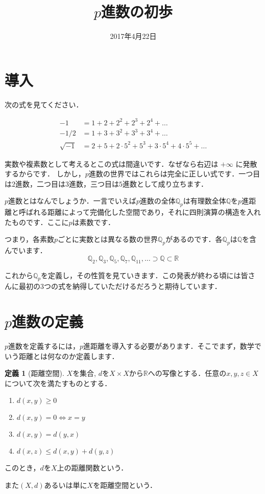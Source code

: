 \documentclass[uplatex]{jsarticle}
\newcommand{\Q}{\mathbb{Q}}
\newcommand{\R}{\mathbb{R}}
\theoremstyle{definition} %
\newtheorem{defi}[thm]{定義}
\begin{document}
\title{$p$進数の初歩}
\date{2017年4月22日}
\maketitle

\section{導入}

次の式を見てください．

\begin{align*}
-1 &= 1 + 2 + 2^2 + 2^3 + 2^4 + \dots \\
-1/2 &= 1 + 3 + 3^2 + 3^3 + 3^4 + \dots \\
\sqrt{-1} &= 2 + 5 + 2 \cdot 5^2 + 5^3 + 3 \cdot 5^4 + 4 \cdot 5^5 + \dots
\end{align*}

実数や複素数として考えるとこの式は間違いです．なぜなら右辺は $+\infty$ に発散するからです．
しかし，$p$進数の世界ではこれらは完全に正しい式です．一つ目は$2$進数，二つ目は$3$進数，三つ目は$5$進数として成り立ちます．

$p$進数とはなんでしょうか．一言でいえば$p$進数の全体$\Q_p$は有理数全体$\Q$を$p$進距離と呼ばれる距離によって完備化した空間であり，それに四則演算の構造を入れたものです．ここに$p$は素数です．

つまり，各素数$p$ごとに実数とは異なる数の世界$\Q_p$があるのです．各$\Q_p$は$\Q$を含んでいます．
\[
\Q_2, \Q_3, \Q_5, \Q_7, \Q_{11}, \dots \supset \Q \subset \mathbb{R}
\]

これから$\Q_p$を定義し，その性質を見ていきます．この発表が終わる頃には皆さんに最初の3つの式を納得していただけるだろうと期待しています．

\section{$p$進数の定義}

$p$進数を定義するには，$p$進距離を導入する必要があります．そこでまず，数学でいう距離とは何なのか定義します．

\begin{oframed}\begin{defi}[距離空間]
$X$を集合, $d$を$X \times X$から$\R$への写像とする．任意の$x, y, z \in X$について次を満たすものとする．
\begin{enumerate}
	\item $d(x, y) \geq 0$
	\item $d(x, y) = 0 \iff x = y$
	\item $d(x, y) = d(y, x)$
	\item $d(x, z) \leq d(x, y) + d(y, z)$
\end{enumerate}
このとき，$d$を$X$上の距離関数という．

また$(X, d)$あるいは単に$X$を距離空間という．
\end{defi}\end{oframed}
\end{document}
